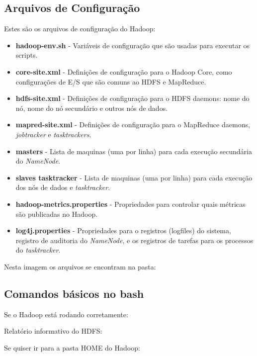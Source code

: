 \documentclass[a4paper,11pt]{article}
\begin{document}
\subsection{Arquivos de Configuração}
Estes são os arquivos de configuração do Hadoop: \vspace{-1em}
\begin{itemize}
	\item \textbf{hadoop-env.sh} - Variáveis de configuração que são usadas para executar os scripts.
	\item \textbf{core-site.xml} - Definições de configuração para o Hadoop Core, como configurações de E/S que são comuns ao HDFS e MapReduce.
	\item \textbf{hdfs-site.xml} - Definições de configuração para o HDFS daemons: nome do nó, nome do nó secundário e outros nós de dados.
	\item \textbf{mapred-site.xml} - Definições de configuração para o MapReduce daemons, \textit{jobtracker} e \textit{tasktrackers}.
	\item \textbf{masters} - Lista de maquinas (uma por linha) para cada execução secundária do \textit{NameNode}.
	\item \textbf{slaves tasktracker} - Lista de maquinas (uma por linha) para cada execução dos nós de dados e \textit{tasktracker}.
	\item \textbf{hadoop-metrics.properties} - Propriedades para controlar quais métricas são publicadas no Hadoop.
	\item \textbf{log4j.properties} - Propriedades para o registros (logfiles) do sistema, registro de auditoria do \textit{NameNode}, e os registros de tarefas para os processos do \textit{tasktracker}.
\end{itemize}

Nesta imagem os arquivos se encontram na pasta: \\

\subsection{Comandos básicos no bash}
Se o Hadoop está rodando corretamente: \\

Relatório informativo do HDFS: \\

Se quiser ir para a pasta HOME do Hadoop: \\
\end{document}
